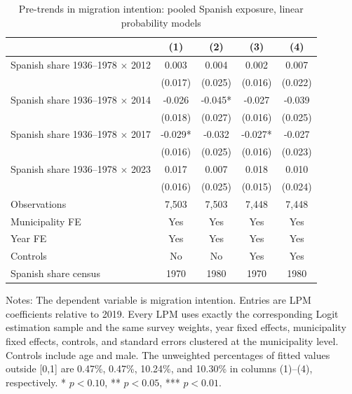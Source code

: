 \begin{table}[!htbp]
\normalsize
\renewcommand{\arraystretch}{1.25}
\setlength{\tabcolsep}{6pt}
\centering
\caption{Pre-trends in migration intention: pooled Spanish exposure, linear probability models}
\label{tab:pooled_pretrends_lpm_stata}
\setlength{\tabcolsep}{4pt}
\captionsetup{justification=centering}
\begin{tabular}{lcccc}
\hline
 & (1) & (2) & (3) & (4) \\
\hline
Spanish share 1936--1978 \(\times\) 2012 & 0.003 & 0.004 & 0.002 & 0.007 \\
 & (0.017) & (0.025) & (0.016) & (0.022) \\
Spanish share 1936--1978 \(\times\) 2014 & -0.026 & -0.045* & -0.027 & -0.039 \\
 & (0.018) & (0.027) & (0.016) & (0.025) \\
Spanish share 1936--1978 \(\times\) 2017 & -0.029* & -0.032 & -0.027* & -0.027 \\
 & (0.016) & (0.025) & (0.016) & (0.023) \\
Spanish share 1936--1978 \(\times\) 2023 & 0.017 & 0.007 & 0.018 & 0.010 \\
 & (0.016) & (0.025) & (0.015) & (0.024) \\
\hline
Observations &        7,503 &        7,503 &        7,448 &        7,448 \\
Municipality FE & Yes & Yes & Yes & Yes \\
Year FE & Yes & Yes & Yes & Yes \\
Controls & No & No & Yes & Yes \\
Spanish share census & 1970 & 1980 & 1970 & 1980 \\
\hline
\end{tabular}
\par\vspace{1.5mm}
\begin{minipage}{0.98\linewidth}
\footnotesize\setlength{\parindent}{0pt}\setlength{\parskip}{1pt}
Notes: The dependent variable is migration intention. Entries are LPM coefficients relative to 2019. Every LPM uses exactly the corresponding Logit estimation sample and the same survey weights, year fixed effects, municipality fixed effects, controls, and standard errors clustered at the municipality level. Controls include age and male. The unweighted percentages of fitted values outside [0,1] are  0.47\%,  0.47\%, 10.24\%, and 10.30\% in columns (1)--(4), respectively. * \(p<0.10\), ** \(p<0.05\), *** \(p<0.01\).
\end{minipage}
\end{table}
